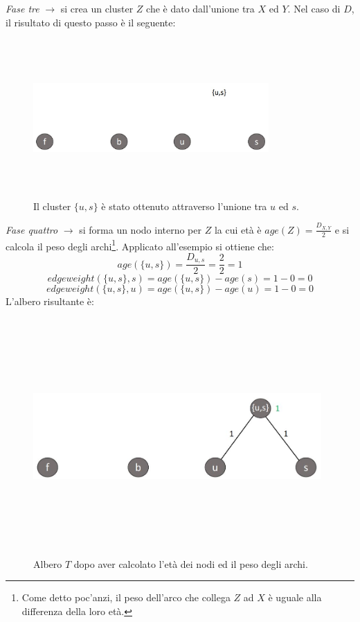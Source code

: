 \newline
\textit{Fase tre} $\rightarrow$ si crea un cluster $Z$ che è dato dall'unione tra $X$ ed $Y$. Nel caso di $D$, il risultato di questo passo è il seguente:
\newpage
\begin{figure}[h!]
\centering
	\includegraphics[height=6cm, width=9cm,keepaspectratio]{rooted_upgma_3.jpg}
 	\caption{Il cluster $\{u, s\}$ è stato ottenuto attraverso l'unione tra $u$ ed $s$.}
  	\label{fig:rooted_upgma_3}
\end{figure}
\textit{Fase quattro} $\rightarrow$ si forma un nodo interno per $Z$ la cui età è $age(Z)=\frac{D_{X,Y}}{2}$ e si calcola il peso degli archi\footnote{Come detto poc'anzi, il peso dell'arco che collega $Z$ ad $X$ è uguale alla differenza della loro età.}. Applicato all'esempio si ottiene che:
\[age(\{u, s\})=\frac{D_{u,s}}{2}=\frac{2}{2}=1\]
\[edgeweight(\{u, s\},s)=age(\{u, s\})-age(s)=1-0=0\]
\[edgeweight(\{u, s\},u)=age(\{u, s\})-age(u)=1-0=0\]
L'albero risultante è:
\begin{figure}[h!]
\centering
	\includegraphics[height=9cm, width=11cm,keepaspectratio]{rooted_upgma_4.jpg}
 	\caption{Albero $T$ dopo aver calcolato l'età dei nodi ed il peso degli archi.}
  	\label{fig:rooted_upgma_4}
\end{figure}
